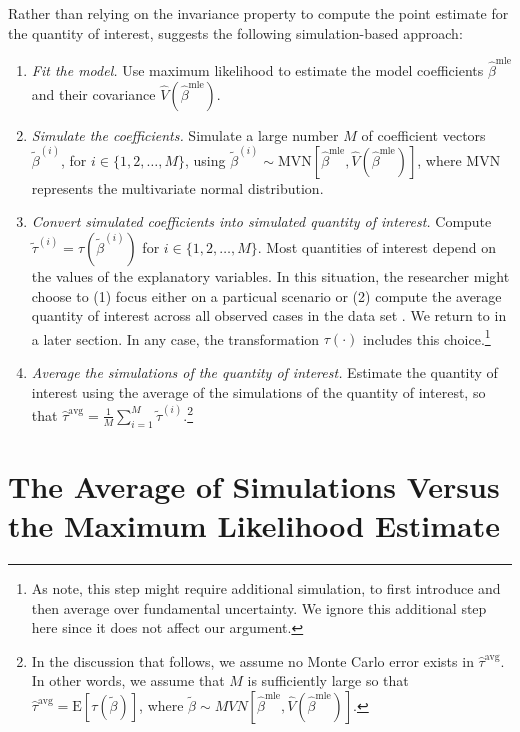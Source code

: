 \documentclass[11pt]{article}
\begin{document}
Rather than relying on the invariance property to compute the point estimate for the quantity of interest, \cite{KingTomzWittenberg2000} suggests the following simulation-based approach:\vspace{.1in}
\begin{enumerate}
\item \textit{Fit the model.}
Use maximum likelihood to estimate the model coefficients $\hat{\beta}^{\text{mle}}$ and their covariance $\hat{V} \left( \hat{\beta}^{\text{mle}} \right)$.
\item \textit{Simulate the coefficients.}
Simulate a large number $M$ of coefficient vectors $\tilde{\beta}^{(i)}$, for $i \in \{1, 2,\ldots, M\}$, using $\tilde{\beta}^{(i)} \sim \text{MVN} \left[ \hat{\beta}^{\text{mle}}, \hat{V} \left( \hat{\beta}^{\text{mle}} \right) \right]$, where MVN represents the multivariate normal distribution.
\item \textit{Convert simulated coefficients into simulated quantity of interest.}
Compute $\tilde{\tau}^{(i)} = \tau \left( \tilde{\beta}^{(i)} \right)$ for $i \in \{1, 2,\ldots, M\}$.
Most quantities of interest depend on the values of the explanatory variables.
In this situation, the researcher might choose to (1) focus either on a particual scenario or (2) compute the average quantity of interest across all observed cases in the data set \citep{HanmerKalkan2013}. 
We return to \cite{HanmerKalkan2013} in a later section.
In any case, the transformation $\tau(\cdot)$ includes this choice.\footnote{As \cite{KingTomzWittenberg2000} note, this step might require additional simulation, to first introduce and then average over fundamental uncertainty.
We ignore this additional step here since it does not affect our argument.}
\item \textit{Average the simulations of the quantity of interest.}
Estimate the quantity of interest using the average of the simulations of the quantity of interest, so that $\hat{\tau}^{\text{avg}} = \frac{1}{M} \sum_{i = 1}^{M} \tilde{\tau}^{(i)}$.\footnote{In the discussion that follows, we assume no Monte Carlo error exists in $\hat{\tau}^{\text{avg}}$.
In other words, we assume that $M$ is sufficiently large so that $\hat{\tau}^{\text{avg}} = \text{E}\left[ \tau \left(\tilde{\beta} \right) \right]$, where $\tilde{\beta} \sim MVN \left[ \hat{\beta}^{\text{mle}}, \hat{V} \left( \hat{\beta}^{\text{mle}} \right) \right]$.}\\
\end{enumerate}

\section*{The Average of Simulations Versus the Maximum Likelihood Estimate}
\end{document}
